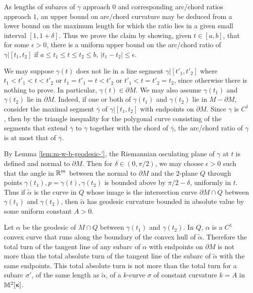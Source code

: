 As lengths of subarcs of $\gamma$ approach $0$ and corresponding arc/chord ratios approach $1$, an upper bound on arc/chord curvature may be deduced from a lower bound on the maximum length for which the ratio lies in a given small interval $[1,1+\delta]$.    Thus we prove the claim by showing,  given $t\in [a,b]$,  that for some  $\epsilon>0$, there is a uniform upper bound on the arc/chord ratio of $\gamma|[t_1,t_2]$ if  $a\le t_1\le t\le t_2\le b$, $|t_1-t_2|\le \epsilon$. 

We may suppose  $\gamma(t)$  does not lie in a line segment $\gamma|[t'_1,t'_2]$ where  $t_1< t'_1< t< t'_2$ or $t_1=t'_1= t< t'_2$ or $ t'_1< t= t'_2=t_2$,  since otherwise there is nothing to prove. In particular, $\gamma(t)\in\partial M$. We may also assume $\gamma(t_1)$ and $\gamma(t_2)$ lie in $\partial M$. Indeed, if one or both of $\gamma(t_1)$ and $\gamma(t_2)$ lie in $M-\partial M$, consider the maximal segment $\overline{\gamma}$ of $\gamma|[t_1,t_2]$ with endpoints on $\partial M$.  Since $\gamma$ is $C^1$, then by the triangle inequality for the polygonal curve consisting of the segments that extend $\overline{\gamma}$  to $\gamma$ together with the chord of $\overline{\gamma}$,  the arc/chord ratio of $\gamma$ is at most that of $\overline{\gamma}$.



By Lemma \ref{lem:m-w-b-geodesic-'}, the 
Riemannian osculating plane of $\gamma$ at $t$ is defined and normal to $\partial M$.
Then for $\delta\in (0,\pi/2)$, we may choose $\epsilon>0$  such that  the  angle  in $\mathbb{R}^m$ between the normal to $\partial M$ and the $2$-plane $Q$ through points $\gamma(t_1), p=\gamma(t), \gamma(t_2)$ is bounded above by $\pi/2-\delta$, uniformly in $t$. Thus if $\tilde\alpha$ is the curve in $Q$  whose image is the intersection curve $\partial M\cap Q$ 
between $\gamma(t_1)$ and $\gamma(t_2)$, then  $\tilde\alpha$ has  geodesic curvature bounded in absolute value by some uniform constant $A>0$.

Let $\alpha$ be the geodesic of $M\cap Q$ between $\gamma(t_1)$ and $\gamma(t_2)$. 
  In $Q$, $\alpha$ is a $C^1$ convex curve that runs along the boundary of the convex hull of $\tilde\alpha$.  Therefore the total turn of  the tangent line of any subarc of  $\alpha$ with endpoints on $\partial M$  is not more than the total absolute turn of the tangent line of the subarc of  $\tilde\alpha$ with the same endpoints. This total absolute turn is not more than the total turn for a subarc $\sigma'$,  of the same length as $\tilde\alpha$, of a $k$-curve $\sigma$ of constant curvature $k=A$ in $\mathbb{M}_{{}}^{2}[{\upkappa}]$.  

